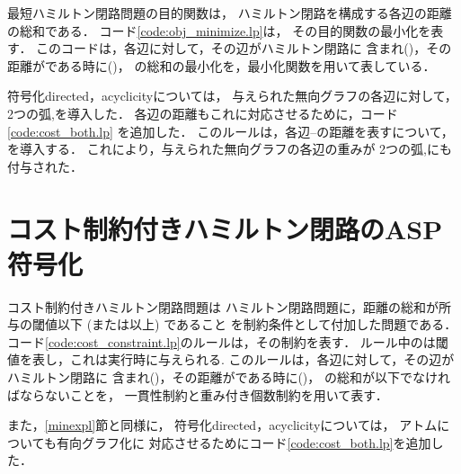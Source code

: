 最短ハミルトン閉路問題の目的関数は，
ハミルトン閉路を構成する各辺の距離の総和である．
コード\ref{code:obj_minimize.lp}は，
その目的関数の最小化を表す．
このコードは，各辺に対して，その辺がハミルトン閉路に
含まれ()，その距離がである時に()，
の総和の最小化を，最小化関数を用いて表している．



符号化directed，acyclicityについては，
与えられた無向グラフの各辺に対して，
2つの弧,を導入した．
各辺の距離もこれに対応させるために，コード\ref{code:cost_both.lp}
を追加した．
このルールは，各辺--の距離を表すについて，
を導入する．
これにより，与えられた無向グラフの各辺の重みが
2つの弧,にも付与された．

\section{コスト制約付きハミルトン閉路のASP符号化}



コスト制約付きハミルトン閉路問題は
ハミルトン閉路問題に，距離の総和が所与の閾値以下 (または以上) であること
を制約条件として付加した問題である．
コード\ref{code:cost_constraint.lp}のルールは，その制約を表す．
ルール中のは閾値を表し，これは実行時に与えられる.
このルールは，各辺に対して，その辺がハミルトン閉路に
含まれ()，その距離がである時に()，
の総和が以下でなければならないことを，
一貫性制約と重み付き個数制約を用いて表す．

また，\ref{minexpl}節と同様に，
符号化directed，acyclicityについては，
アトムについても有向グラフ化に
対応させるためにコード\ref{code:cost_both.lp}を追加した．


